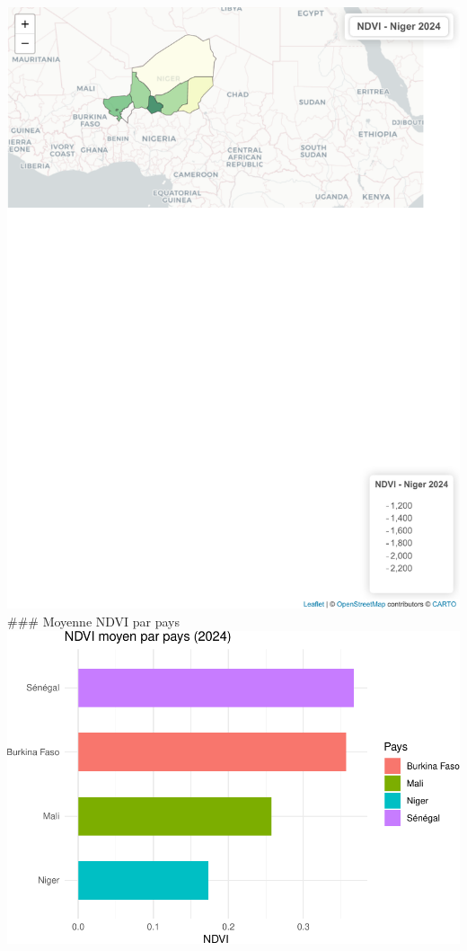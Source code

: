 \documentclass[
]{book}
\begin{document}
\includegraphics{Atlas-Spectral-Sahel_files/figure-latex/ndvi-cartes-4.pdf}
\#\#\# Moyenne NDVI par pays
\includegraphics{Atlas-Spectral-Sahel_files/figure-latex/ndvi-plot-1.pdf}
\end{document}
